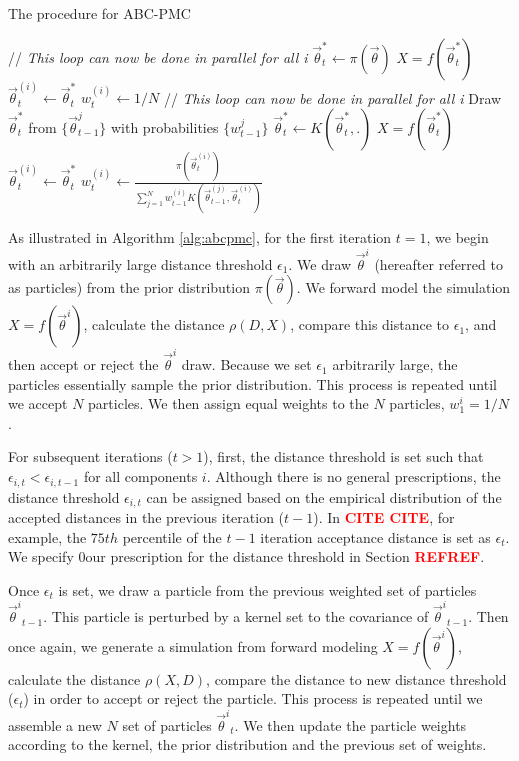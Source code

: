 \documentclass[12pt, preprint]{aastex}
\newcommand{\todo}[1]{{\bf \textcolor{red}{ #1}}}
\newcommand{\pars}{\vec{\theta}}
\begin{document}
\begin{algorithm} 
\caption{The procedure for ABC-PMC}
\begin{algorithmic}[1] \label{alg:abcpmc}
   \STATE // \emph{This loop can now be done in parallel for all i}
   \STATE $\pars^{*}_{t} \gets \pi(\pars)$
   \STATE $X = f(\pars^{*}_{t})$
   \ENDWHILE
   \STATE $\pars^{(i)}_{t} \gets \pars^{*}_{t}$
   \STATE $w^{(i)}_{t} \gets 1/N$
\ENDFOR
\ENDIF
{}
   \STATE // \emph{This loop can now be done in parallel for all i}
   \STATE Draw $\pars^{*}_{t}$ from $\{\pars^{j}_{t-1}\}$ with probabilities $\{w^{j}_{t-1}\}$
   \STATE $\pars^{*}_{t} \gets K(\pars^{*}_{t},.)$
   \STATE $X = f(\pars^{*}_{t})$
   \ENDWHILE
   \STATE $\pars^{(i)}_{t} \gets \pars^{*}_{t}$
   \STATE $w^{(i)}_{t} \gets \frac{\pi(\pars^{(i)}_{t})}{\sum_{j=1}^{N}w_{t-1}^{(i)}K(\pars^{(j)}_{t-1},\pars^{(i)}_{t})}$
\ENDFOR
\ENDIF
\end{algorithmic}
\end{algorithm}

As illustrated in Algorithm \ref{alg:abcpmc}, for the first iteration $t = 1$, 
we begin with an arbitrarily large distance threshold $\epsilon_1$. We 
draw $\pars^i$ (hereafter referred to as particles) from the prior distribution 
$\pi(\pars)$. We forward model the simulation $X = f(\pars^i)$, calculate the 
distance $\rho(D, X)$, compare this distance to $\epsilon_1$, and then 
accept or reject the $\pars^i$ draw. Because we set $\epsilon_1$ arbitrarily large, 
the particles essentially sample the prior distribution. This process 
is repeated until we accept $N$ particles. We then assign equal weights to 
the $N$ particles, $w_1^i = 1/N$.

For subsequent iterations ($t > 1$), first, the distance threshold is set such that
$\epsilon_{i,t} < \epsilon_{i,t-1}$ for all components $i$. Although there is 
no general prescriptions, the distance threshold $\epsilon_{i,t}$ can be 
assigned based on the empirical distribution of the accepted distances in the 
previous iteration ($t-1$). In \todo{CITE CITE}, for example, the $75th$ percentile 
of the $t-1$ iteration acceptance distance is set as $\epsilon_t$. We specify
0our prescription for the distance threshold in Section \todo{REFREF}. 

Once $\epsilon_t$ is set, we draw a particle from the previous 
weighted set of particles ${\pars^i}_{t-1}$. 
This particle is perturbed by a kernel set to the covariance of 
${\pars^i}_{t-1}$. Then once again, we generate a simulation from 
forward modeling $X = f(\pars^i)$, calculate the distance $\rho(X, D)$, 
compare the distance to new distance threshold ($\epsilon_t$) in order 
to accept or reject the particle. This process is repeated until we 
assemble a new $N$ set of particles ${\pars^i}_t$. We then update the 
particle weights according to the kernel, the prior distribution and the 
previous set of weights. 
\end{document}
